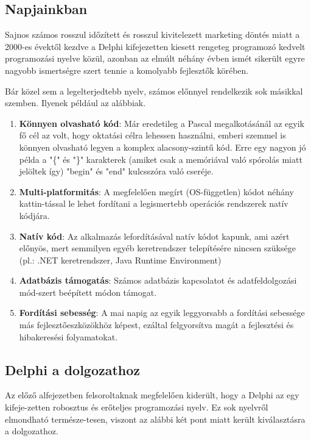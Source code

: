 \subsection{Napjainkban}

Sajnos számos rosszul időzített és rosszul kivitelezett marketing döntés miatt a 2000-es évektől kezdve a Delphi kifejezetten kiesett rengeteg programozó kedvelt programozási nyelve közül, azonban az elmúlt néhány évben ismét sikerült egyre nagyobb ismertségre szert tennie a komolyabb fejlesztők körében.

Bár közel sem a legelterjedtebb nyelv, számos előnnyel rendelkezik sok másikkal szemben. Ilyenek például az alábbiak.
\begin{enumerate}
	\item \textbf{Könnyen olvasható kód}: Már eredetileg a Pascal megalkotásánál az egyik fő cél az volt, hogy oktatási célra lehessen használni, emberi szemmel is könnyen olvasható legyen a komplex alacsony-szintű kód. Erre egy nagyon jó példa a "\{" és "\}" karakterek (amiket csak a memóriával való spórolás miatt jelöltek így) "begin" és "end" kulcsszóra való cseréje.
	\item \textbf{Multi-platformitás}: A megfelelően megírt (OS-független) kódot néhány kattin\hyp{}tással le lehet fordítani a legismertebb operációs rendszerek natív kódjára.
	\item \textbf{Natív kód}: Az alkalmazás lefordításával natív kódot kapunk, ami azért előnyös, mert semmilyen egyéb keretrendszer telepítésére nincsen szüksége (pl.: .NET keretrendszer, Java Runtime Environment)
	\item \textbf{Adatbázis támogatás}: Számos adatbázis kapcsolatot és adatfeldolgozási mód\hyp{}szert beépített módon támogat.
	\item \textbf{Fordítási sebesség}: A mai napig az egyik leggyorsabb a fordítási sebessége más fejlesztőeszközökhöz képest, ezáltal felgyorsítva magát a fejlesztési és hibakeresési folyamatokat.
\end{enumerate}

\subsection{Delphi a dolgozathoz}

Az előző alfejezetben felsoroltaknak megfelelően kiderült, hogy a Delphi az egy kifeje\hyp{}zetten robosztus és erőteljes programozási nyelv. Ez sok nyelvről elmondható természe\hyp{}tesen, viszont az alábbi két pont miatt került kiválasztásra a dolgozathoz.

